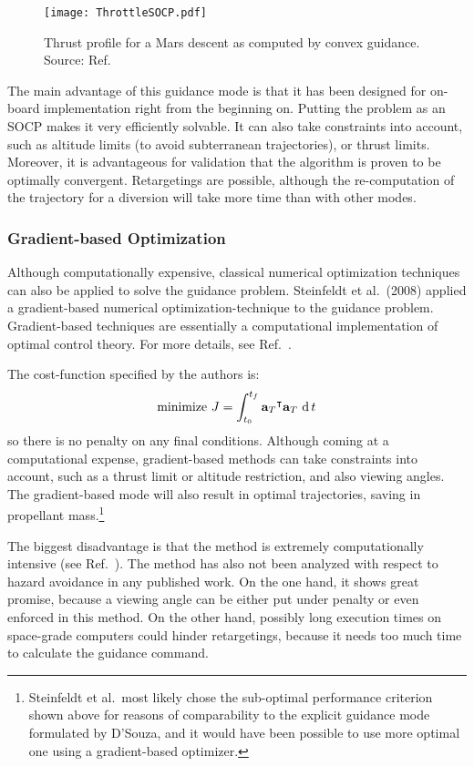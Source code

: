 \documentclass[%
]{aiaa-tc}
\begin{document}
\begin{figure}
    \centering
    \texttt{[image: ThrottleSOCP.pdf]}
    \caption{%
        Thrust profile for a Mars descent as computed by convex guidance. 
        Source: Ref.~
    }
    \label{fig:socpthrust}
\end{figure}


The main advantage of this guidance mode is that it has been designed for
on-board implementation right from the beginning on. Putting the problem as an
SOCP makes it very efficiently solvable. It can also take constraints into
account, such as altitude limits (to avoid subterranean trajectories), or thrust
limits. Moreover, it is advantageous for validation that the algorithm is proven
to be optimally convergent. Retargetings are possible, although the
re-computation of the trajectory for a diversion will take more time than with
other modes.

\subsubsection{Gradient-based Optimization}

Although computationally expensive, classical numerical optimization techniques
can also be applied to solve the guidance problem.  Steinfeldt et al.\ (2008)
applied a gradient-based numerical optimization-technique to the guidance
problem.\cite{Steinfeldt2008}  Gradient-based techniques are
essentially a computational implementation of optimal control theory. For more
details, see Ref.~.

The cost-function specified by the authors is:
\begin{align}
    \text{minimize\ } J = \int_{t_0}^{t_f} {\mathbf{a}_T}^{\intercal}\mathbf{a}_T \,
    \operatorname{d} t 
\end{align}
so there is no penalty on any final conditions. Although coming at a
computational expense, gradient-based methods can take constraints into account,
such as a thrust limit or altitude restriction, and also viewing angles. The
gradient-based mode will also result in optimal trajectories, saving in
propellant mass.\footnote{Steinfeldt et al.\ most likely chose the sub-optimal
    performance criterion shown above for reasons of comparability to the
    explicit guidance mode formulated by D'Souza,\cite{DSouza1997} and it would
    have been possible to use more optimal one using a gradient-based
    optimizer.}

The biggest disadvantage is that the method is extremely computationally
intensive (see Ref.~). The method has also not been
analyzed with respect to hazard avoidance in any published work. On the one
hand, it shows great promise, because a viewing angle can be either put under
penalty or even enforced in this method. On the other hand, possibly long
execution times on space-grade computers could hinder retargetings, because it
needs too much time to calculate the guidance command.
\end{document}
